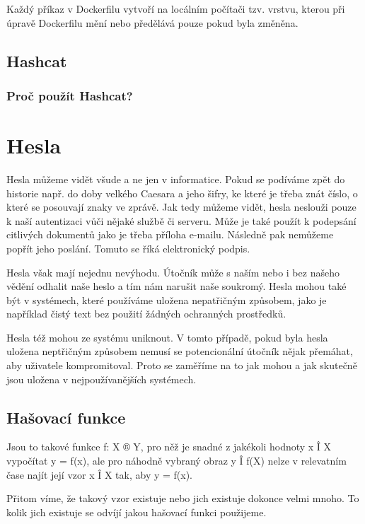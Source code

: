 \documentclass[thesis=B,czech]{FITthesis}[2019/12/23]
\begin{document}
Každý příkaz v Dockerfilu vytvoří na locálním počítači tzv. vrstvu, kterou při úpravě Dockerfilu mění nebo předělává pouze pokud byla změněna. 


\section{Hashcat}

\subsection{Proč použít Hashcat?}

\chapter{Hesla}

Hesla můžeme vidět všude a ne jen v informatice. 
Pokud se podíváme zpět do historie např. do doby velkého Caesara a jeho šifry, ke které je třeba znát číslo, o které se posouvají znaky ve zprávě. 
Jak tedy můžeme vidět, hesla neslouži pouze k naší autentizaci vůči nějaké službě či serveru. 
Může je také použít k podepsání citlivých dokumentů jako je třeba příloha e-mailu. 
Následně pak nemůžeme popřít jeho poslání. Tomuto se říká elektronický podpis. 

Hesla však mají nejednu nevýhodu. Útočník může s naším nebo i bez našeho vědění odhalit naše heslo a tím nám narušit naše soukromý. Hesla mohou také být v systémech, které používáme uložena nepatřičným způsobem, jako je například čistý text bez použití žádných ochranných prostředků. 

Hesla též mohou ze systému uniknout. V tomto případě, pokud byla hesla uložena neptřičným způsobem nemusí se potencionální útočník nějak přemáhat, aby uživatele kompromitoval. Proto se zaměříme na to jak mohou a jak skutečně jsou uložena v nejpoužívanějších systémech. 

\section{Hašovací funkce}

Jsou to takové funkce f: X ® Y, pro něž je snadné z jakékoli hodnoty x Î X vypočítat y = f(x), ale pro náhodně vybraný obraz y Î f(X) nelze v relevatním čase najít její vzor x Î X tak, aby y = f(x).

Přitom víme, že takový vzor existuje nebo jich existuje dokonce velmi mnoho. To kolik jich existuje se odvíjí jakou hašovací funkci použijeme.
\end{document}
